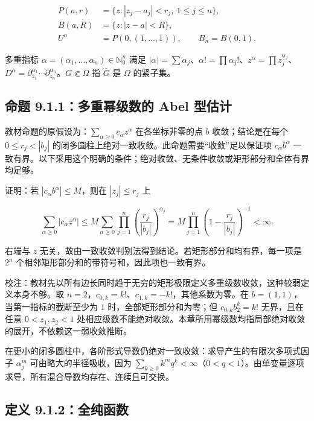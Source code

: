 \documentclass[11pt,a4paper]{article}
\begin{document}
\[
\begin{aligned}
P(a,r)&=\{z:|z_j-a_j|<r_j,\ 1\le j\le n\},\\
B(a,R)&=\{z:|z-a|<R\},\\
U^n&=P(0,(1,\ldots,1)),\qquad B_n=B(0,1).
\end{aligned}
\]

多重指标 \(\alpha=(\alpha_1,\ldots,\alpha_n)\in\mathbb N_0^n\) 满足
\(|\alpha|=\sum\alpha_j\)、\(\alpha!=\prod\alpha_j!\)、\(z^\alpha=\prod z_j^{\alpha_j}\)、\(D^\alpha=\partial_{z_1}^{\alpha_1}\cdots\partial_{z_n}^{\alpha_n}\)。\(G\Subset\Omega\)
指 \(\overline G\) 是 \(\Omega\) 的紧子集。

\subsection{命题 9.1.1：多重幂级数的 Abel 型估计}\label{ch09-s1-heading-3}

教材命题的原假设为：\(\sum_{\alpha\ge0}c_\alpha z^\alpha\)
在各坐标非零的点 \(b\) 收敛；结论是在每个 \(0\le r_j<|b_j|\)
的闭多圆柱上绝对一致收敛。此命题需要``收敛''足以保证项
\(c_\alpha b^\alpha\)
一致有界。以下采用这个明确的条件；绝对收敛、无条件收敛或矩形部分和全体有界均足够。

证明：若 \(|c_\alpha b^\alpha|\le M\)，则在 \(|z_j|\le r_j\) 上

\[
\sum_{\alpha\ge0}|c_\alpha z^\alpha|
\le M\sum_{\alpha\ge0}\prod_{j=1}^n\left(\frac{r_j}{|b_j|}\right)^{\alpha_j}
=M\prod_{j=1}^n\left(1-\frac{r_j}{|b_j|}\right)^{-1}<\infty.
\]

右端与 \(z\)
无关，故由一致收敛判别法得到结论。若矩形部分和均有界，每一项是 \(2^n\)
个相邻矩形部分和的带符号和，因此项也一致有界。

校注：教材先以所有边长同时趋于无穷的矩形极限定义多重级数收敛，这种较弱定义本身不够。取
\(n=2\)，\(c_{0,k}=k!\)、\(c_{1,k}=-k!\)，其他系数为零。在
\(b=(1,1)\)，当第一指标的截断至少为 \(1\) 时，全部矩形部分和为零；但
\(c_{0,k}b_2^k=k!\) 无界，且在任意 \(0<z_1,z_2<1\)
处相应级数不能绝对收敛。本章所用幂级数均指局部绝对收敛的展开，不依赖这一弱收敛推断。

在更小的闭多圆柱中，各阶形式导数仍绝对一致收敛：求导产生的有限次多项式因子
\(\alpha_j^m\) 可由略大的半径吸收，因为
\(\sum_{k\ge0}k^m q^k<\infty\)（\(0<q<1\)）。由单变量逐项求导，所有混合导数均存在、连续且可交换。

\subsection{定义 9.1.2：全纯函数}\label{ch09-s1-heading-4}
\end{document}
